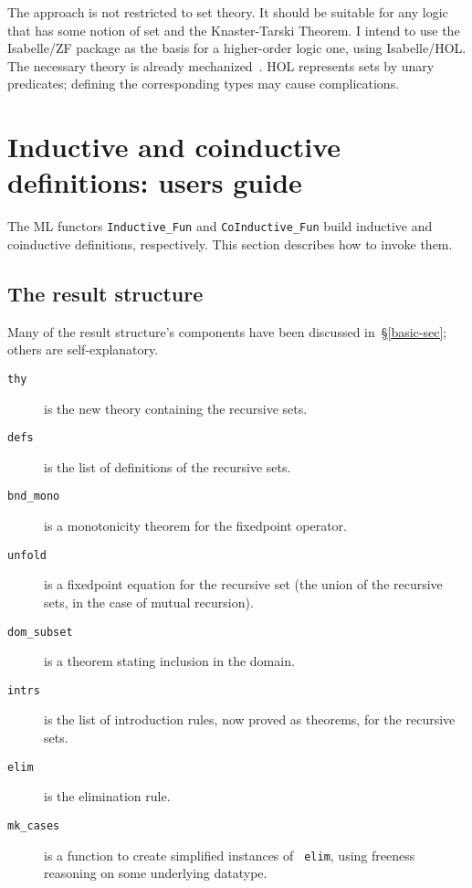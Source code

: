 The approach is not restricted to set theory.  It should be suitable for
any logic that has some notion of set and the Knaster-Tarski Theorem.  I
intend to use the Isabelle/ZF package as the basis for a higher-order logic
one, using Isabelle/HOL\@.  The necessary theory is already
mechanized~\cite{paulson-coind}.  HOL represents sets by unary predicates;
defining the corresponding types may cause complications.





\ifCADE{}
\else
\newpage
\appendix
\section{Inductive and coinductive definitions: users guide}
The ML functors \verb|Inductive_Fun| and \verb|CoInductive_Fun| build
inductive and coinductive definitions, respectively.  This section describes
how to invoke them.  

\subsection{The result structure}
Many of the result structure's components have been discussed
in~\S\ref{basic-sec}; others are self-explanatory.
\begin{description}
\item[\tt thy] is the new theory containing the recursive sets.

\item[\tt defs] is the list of definitions of the recursive sets.

\item[\tt bnd\_mono] is a monotonicity theorem for the fixedpoint operator.

\item[\tt unfold] is a fixedpoint equation for the recursive set (the union of
the recursive sets, in the case of mutual recursion).

\item[\tt dom\_subset] is a theorem stating inclusion in the domain.

\item[\tt intrs] is the list of introduction rules, now proved as theorems, for
the recursive sets.

\item[\tt elim] is the elimination rule.

\item[\tt mk\_cases] is a function to create simplified instances of {\tt
elim}, using freeness reasoning on some underlying datatype.
\end{description}

